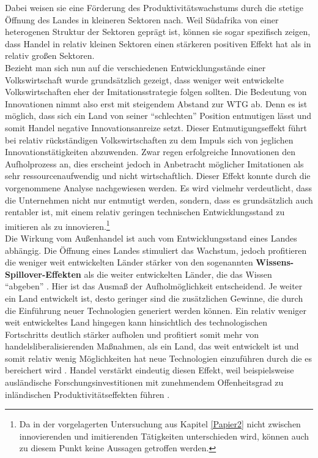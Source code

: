 Dabei weisen sie eine Förderung des Produktivitätswachstums durch die stetige Öffnung des Landes in kleineren Sektoren nach.  Weil Südafrika von einer heterogenen Struktur der Sektoren geprägt ist, können sie sogar spezifisch zeigen, dass Handel in relativ kleinen Sektoren einen stärkeren positiven Effekt hat als in relativ großen Sektoren.\\
%
Bezieht man sich nun auf die verschiedenen Entwicklungsstände einer Volkswirtschaft 
wurde grundsätzlich gezeigt, dass weniger weit entwickelte Volkswirtschaften eher der Imitationsstrategie folgen sollten. Die Bedeutung von Innovationen nimmt also erst mit steigendem Abstand zur WTG ab. Denn es ist möglich, dass sich ein Land von seiner "`schlechten"' Position entmutigen lässt und somit Handel negative Innovationsanreize setzt. Dieser Entmutigungseffekt führt bei relativ rückständigen Volkswirtschaften zu dem Impuls sich von jeglichen Innovationstätigkeiten abzuwenden. Zwar regen erfolgreiche Innovationen den Aufholprozess an, dies erscheint jedoch in Anbetracht möglicher Imitationen als sehr ressourcenaufwendig und nicht wirtschaftlich.  
Dieser Effekt konnte durch die vorgenommene Analyse nachgewiesen werden. Es wird vielmehr verdeutlicht, dass die Unternehmen nicht nur entmutigt werden, sondern, dass es grundsätzlich auch rentabler ist, mit einem relativ geringen technischen Entwicklungsstand zu imitieren als zu innovieren.\footnote{Da in der vorgelagerten Untersuchung aus Kapitel \ref{Papier2} nicht zwischen innovierenden und imitierenden Tätigkeiten unterschieden wird, können auch zu diesem Punkt keine Aussagen getroffen werden.}\\
%
Die Wirkung vom Außenhandel ist auch vom Entwicklungsstand eines Landes abhängig. Die Öffnung eines Landes stimuliert das Wachstum, jedoch profitieren die weniger weit entwickelten Länder stärker von den sogenannten \textbf{Wissens-Spillover-Effekten} als die weiter entwickelten Länder, die das Wissen "`abgeben"' \cite{Sachs.1995,Grossman.1990b}. Hier ist das Ausmaß der Aufholmöglichkeit entscheidend. Je weiter ein Land entwickelt ist, desto geringer sind die zusätzlichen Gewinne, die durch die Einführung neuer Technologien generiert werden können. Ein relativ weniger weit entwickeltes Land hingegen kann hinsichtlich des technologischen Fortschritts deutlich stärker aufholen und profitiert somit mehr von handelsliberalisierenden Maßnahmen, als  ein Land, das weit entwickelt ist und somit relativ wenig Möglichkeiten hat neue Technologien einzuführen durch die es bereichert wird \cite{Keller.2004}. Handel verstärkt eindeutig diesen Effekt, weil beispielsweise ausländische Forschungsinvestitionen mit zunehmendem Offenheitsgrad zu inländischen Produktivitätseffekten führen \cite{Coe.1995}.\\ 

